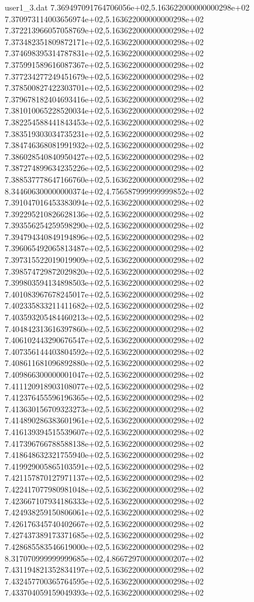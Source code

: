 \begin{filecontents}{user1_3.dat}
7.369497091764706056e+02,5.163622000000000298e+02
7.370973114003656974e+02,5.163622000000000298e+02
7.372213966057058769e+02,5.163622000000000298e+02
7.373482351809872171e+02,5.163622000000000298e+02
7.374698395314787831e+02,5.163622000000000298e+02
7.375991589616087367e+02,5.163622000000000298e+02
7.377234277249451679e+02,5.163622000000000298e+02
7.378500827422303701e+02,5.163622000000000298e+02
7.379678182404693416e+02,5.163622000000000298e+02
7.381010065228520034e+02,5.163622000000000298e+02
7.382254588441843453e+02,5.163622000000000298e+02
7.383519303034735231e+02,5.163622000000000298e+02
7.384746368081991932e+02,5.163622000000000298e+02
7.386028540840950427e+02,5.163622000000000298e+02
7.387274899634235226e+02,5.163622000000000298e+02
7.388537778647166760e+02,5.163622000000000298e+02
8.344606300000000374e+02,4.756587999999999852e+02
7.391047016453383094e+02,5.163622000000000298e+02
7.392295210826628136e+02,5.163622000000000298e+02
7.393556254259598290e+02,5.163622000000000298e+02
7.394794340849194896e+02,5.163622000000000298e+02
7.396065492065813487e+02,5.163622000000000298e+02
7.397315522019019909e+02,5.163622000000000298e+02
7.398574729872029820e+02,5.163622000000000298e+02
7.399803594134898503e+02,5.163622000000000298e+02
7.401083967678245017e+02,5.163622000000000298e+02
7.402335833211411682e+02,5.163622000000000298e+02
7.403593205484460213e+02,5.163622000000000298e+02
7.404842313616397860e+02,5.163622000000000298e+02
7.406102443290676547e+02,5.163622000000000298e+02
7.407356144403804592e+02,5.163622000000000298e+02
7.408611681096892880e+02,5.163622000000000298e+02
7.409866300000001047e+02,5.163622000000000298e+02
7.411120918903108077e+02,5.163622000000000298e+02
7.412376455596196365e+02,5.163622000000000298e+02
7.413630156709323273e+02,5.163622000000000298e+02
7.414890286383601961e+02,5.163622000000000298e+02
7.416139394515539607e+02,5.163622000000000298e+02
7.417396766788588138e+02,5.163622000000000298e+02
7.418648632321755940e+02,5.163622000000000298e+02
7.419929005865103591e+02,5.163622000000000298e+02
7.421157870127971137e+02,5.163622000000000298e+02
7.422417077980981048e+02,5.163622000000000298e+02
7.423667107934186333e+02,5.163622000000000298e+02
7.424938259150806061e+02,5.163622000000000298e+02
7.426176345740402667e+02,5.163622000000000298e+02
7.427437389173371685e+02,5.163622000000000298e+02
7.428685583546619000e+02,5.163622000000000298e+02
8.317070999999999685e+02,4.866729700000000207e+02
7.431194821352834197e+02,5.163622000000000298e+02
7.432457700365764595e+02,5.163622000000000298e+02
7.433704059159049393e+02,5.163622000000000298e+02

\end{filecontents}
